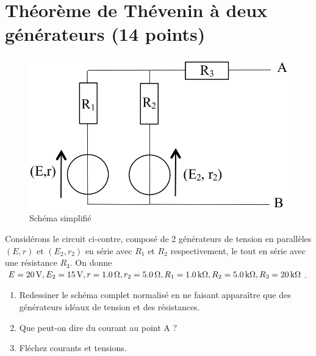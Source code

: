 \documentclass[10pt,a4paper]{article}
\begin{document}
\newpage

\section{Théorème de Thévenin à deux générateurs (14 points)}
\begin{figure}
    \vspace*{-25pt}
    \raggedleft
    \includegraphics[width=\linewidth]{th_sup_2.png}
    \captionsetup{justification=centering}
    \caption{Schéma simplifié}
    \label{fig:solo}
\end{figure}

Considérons le circuit ci-contre, composé de 2 générateurs de tension 
en parallèles $(E, r)$ et $(E_2, r_2)$ en série avec $R_1$ et $R_2$
respectivement, le tout en série avec une résistance $R_3$. On donne $E =
\SI{20}{V}, E_2 = \SI{15}{V}, r = \SI{1.0}{\Omega}, r_2 = \SI{5.0}{\Omega}, R_1 =
\SI{1.0}{k\Omega}, R_2 = \SI{5.0}{k\Omega}, R_3 = \SI{20}{k\Omega}$.

\begin{enumerate}[label=\color{brandeisblue}\arabic*)]
    \item Redessiner le schéma complet normalisé en ne faisant apparaître que
        des générateurs idéaux de tension et des résistances.
        \vspace{3cm}
    \item Que peut-on dire du courant au point A ?
        \vspace{1cm}
    \item Fléchez courants et tensions.
\end{enumerate}
\end{document}
